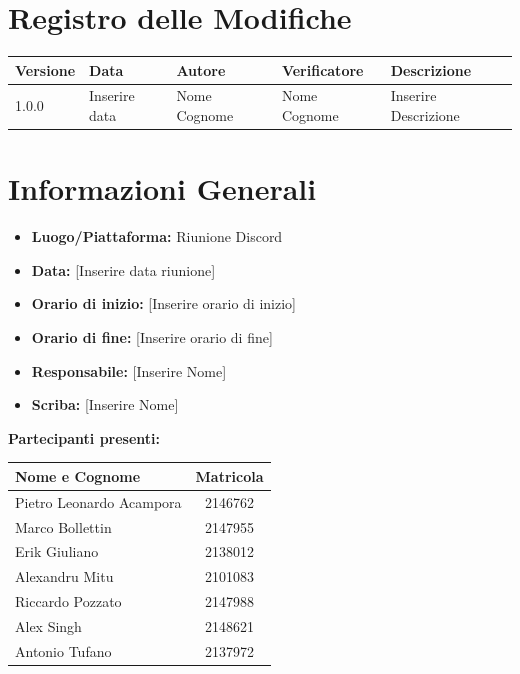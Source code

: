\documentclass[a4paper, 11pt]{article}
\begin{document}
\newpage

\section*{Registro delle Modifiche}
\vspace{0.5cm}
\begin{center}
\renewcommand{\arraystretch}{1.5}
\begin{tabularx}{\textwidth}{|l|l|l|l|X|}
\hline
\textbf{Versione} & \textbf{Data} & \textbf{Autore} & \textbf{Verificatore} & \textbf{Descrizione} \\ \hline
1.0.0 & Inserire data & Nome Cognome & Nome Cognome & Inserire Descrizione \\ \hline
\end{tabularx}
\end{center}

\newpage

\tableofcontents
\newpage

\section{Informazioni Generali}
\begin{itemize}
    \item \textbf{Luogo/Piattaforma:} Riunione Discord
    \item \textbf{Data:} [Inserire data riunione]
    \item \textbf{Orario di inizio:} [Inserire orario di inizio]
    \item \textbf{Orario di fine:} [Inserire orario di fine]
    \item \textbf{Responsabile:} [Inserire Nome]
    \item \textbf{Scriba:} [Inserire Nome]
\end{itemize}

\vspace{0.5cm}
\textbf{Partecipanti presenti:} \\
\vspace{0.2cm}
\renewcommand{\arraystretch}{1.2}
\begin{tabularx}{0.8\textwidth}{|X|c|}
\hline
\textbf{Nome e Cognome} & \textbf{Matricola} \\ \hline
Pietro Leonardo Acampora & 2146762 \\ \hline
Marco Bollettin & 2147955 \\ \hline
Erik Giuliano & 2138012 \\ \hline
Alexandru Mitu & 2101083 \\ \hline
Riccardo Pozzato & 2147988 \\ \hline
Alex Singh & 2148621 \\ \hline
Antonio Tufano & 2137972 \\ \hline
\end{tabularx}
\end{document}
